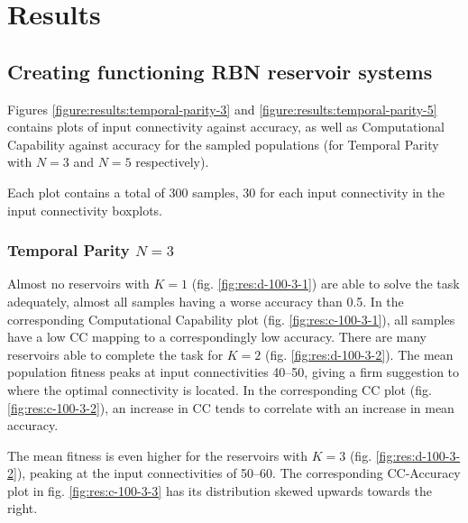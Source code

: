 \section{Results}

\subsection{Creating functioning RBN reservoir systems}
\label{results:rbn-reservoirs}

Figures \ref{figure:results:temporal-parity-3} and \ref{figure:results:temporal-parity-5} contains plots of input connectivity against accuracy,
as well as Computational Capability against accuracy for the sampled populations (for Temporal Parity with $N=3$ and $N=5$ respectively).

Each plot contains a total of 300 samples, 30 for each input connectivity in the input connectivity boxplots.

\subsubsection{Temporal Parity $N=3$}
\label{results:rbn-reservoirs-3}

Almost no reservoirs with $K=1$ (fig. \ref{fig:res:d-100-3-1}) are able to solve the task adequately,
almost all samples having a worse accuracy than 0.5.
In the corresponding Computational Capability plot (fig. \ref{fig:res:c-100-3-1}),
all samples have a low CC mapping to a correspondingly low accuracy.
There are many reservoirs able to complete the task for $K=2$ (fig. \ref{fig:res:d-100-3-2}).
The mean population fitness peaks at input connectivities 40–50,
giving a firm suggestion to where the optimal connectivity is located.
In the corresponding CC plot (fig. \ref{fig:res:c-100-3-2}),
an increase in CC tends to correlate with an increase in mean accuracy.

The mean fitness is even higher for the reservoirs with $K=3$ (fig. \ref{fig:res:d-100-3-2}),
peaking at the input connectivities of 50–60.
The corresponding CC-Accuracy plot in fig. \ref{fig:res:c-100-3-3}
has its distribution skewed upwards towards the right.

